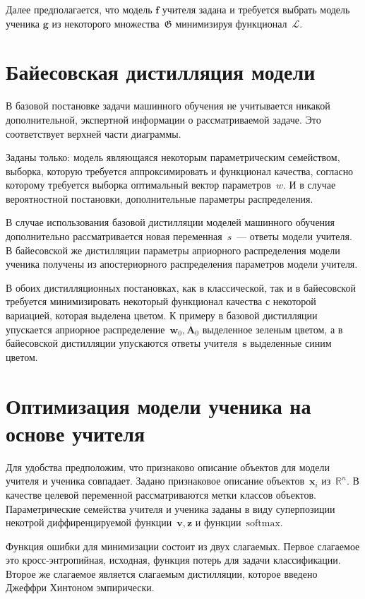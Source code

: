 \documentclass[10pt, twoside]{article}
\begin{document}
Далее предполагается, что модель $\mathbf{f}$ учителя задана и требуется выбрать модель ученика $\mathbf{g}$ из некоторого множества~$\mathfrak{G}$ минимизируя функционал~$\mathcal{L}$.

\section{Байесовская дистилляция модели}
В базовой постановке задачи машинного обучения не учитывается никакой дополнительной, экспертной информации о рассматриваемой задаче. Это соответствует верхней части диаграммы.

Заданы только: модель являющаяся некоторым параметрическим семейством, выборка, которую требуется аппроксимировать и функционал качества, согласно которому требуется выборка оптимальный вектор параметров~$w$. И в случае вероятностной постановки, дополнительные параметры распределения.

В случае использования базовой дистилляции моделей машинного обучения дополнительно рассматривается новая переменная~$s$~--- ответы модели учителя. В байесовской же дистилляции параметры априорного распределения модели ученика получены из апостериорного распределения параметров модели учителя.

В обоих дистилляционных постановках, как в классической, так и в байесовской требуется минимизировать некоторый функционал качества с некоторой вариацией, которая выделена цветом. К примеру в базовой дистилляции упускается априорное распределение~$\mathbf{w}_0, \mathbf{A}_0$ выделенное зеленым цветом, а в байесовской дистилляции упускаются ответы учителя~$\mathbf{s}$ выделенные синим цветом.

\section{Оптимизация модели ученика на основе учителя}
Для удобства предположим, что признаково описание объектов для модели учителя и ученика совпадает. Задано признаковое описание объектов~$\mathbf{x}_i$ из~$\mathbb{R}^{n}.$ В качестве целевой переменной рассматриваются метки классов объектов. Параметрические семейства учителя и ученика заданы в виду суперпозиции некотрой диффиренцируемой функции~$\mathbf{v}, \mathbf{z}$ и функции~$\text{softmax}$.

Функция ошибки для минимизации состоит из двух слагаемых. Первое слагаемое это кросс-энтропийная, исходная, функция потерь для задачи классификации. Второе же слагаемое является слагаемым дистилляции, которое введено Джеффри Хинтоном эмпирически.
\end{document}

